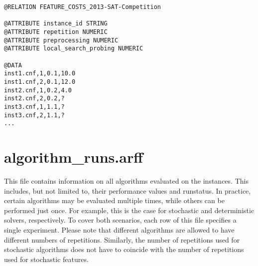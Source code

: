 \begin{lstlisting}[caption=Example feature\_costs.arff]
@RELATION FEATURE_COSTS_2013-SAT-Competition

@ATTRIBUTE instance_id STRING
@ATTRIBUTE repetition NUMERIC
@ATTRIBUTE preprocessing NUMERIC
@ATTRIBUTE local_search_probing NUMERIC

@DATA
inst1.cnf,1,0.1,10.0
inst1.cnf,2,0.1,12.0
inst2.cnf,1,0.2,4.0
inst2.cnf,2,0.2,?
inst3.cnf,1,1.1,?
inst3.cnf,2,1.1,?
...
\end{lstlisting}


\section{algorithm\_runs.arff}

This file contains information on all algorithms evaluated on the instances. This includes, but not limited to,
their performance values and runstatus. In practice, certain algorithms may be evaluated multiple times,
while others can be performed just once. For example, this is the case for stochastic and deterministic 
solvers, respectively. To cover both scenarios, each row of this file specifies a single experiment. Please 
note that different algorithms are allowed to have different numbers of repetitions. Similarly, the number of 
repetitions used for stochastic algorithms does not have to coincide with the number of repetitions used
for stochastic features. 


